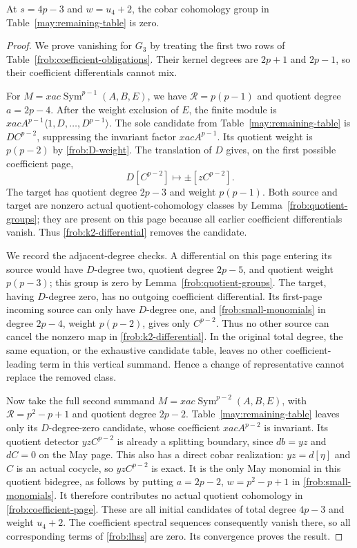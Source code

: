 \begin{proposition}[The row $k=2$]\label{frob:k2}
At $s=4p-3$ and $w=u_4+2$, the cobar cohomology group in
Table~\ref{may:remaining-table} is zero.
\end{proposition}

\begin{proof}
We prove vanishing for $G_3$ by treating the first two rows of
Table~\ref{frob:coefficient-obligations}.  Their kernel degrees are
$2p+1$ and $2p-1$, so their coefficient differentials cannot mix.

For $M=xac\operatorname{Sym}^{p-1}(A,B,E)$, we have
$\mathcal R=p(p-1)$ and quotient degree $a=2p-4$.
After the weight exclusion of $E$, the finite module is
$xacA^{p-1}\langle1,D,\ldots,D^{p-1}\rangle$.
The sole candidate from Table~\ref{may:remaining-table} is
$D C^{p-2}$, suppressing the invariant factor $xacA^{p-1}$.
Its quotient weight is $p(p-2)$ by \eqref{frob:D-weight}.
The translation of $D$ gives, on the first possible coefficient page,
\begin{equation}\label{frob:k2-differential}
 D[C^{p-2}]\longmapsto \pm[zC^{p-2}].
\end{equation}
The target has quotient degree $2p-3$ and weight $p(p-1)$.
Both source and target are nonzero actual quotient-cohomology classes
by Lemma~\ref{frob:quotient-groups}; they are present on this page because
all earlier coefficient differentials vanish.  Thus
\eqref{frob:k2-differential} removes the candidate.

We record the adjacent-degree checks.  A differential on this page
entering its source would have $D$-degree two, quotient degree
$2p-5$, and quotient weight $p(p-3)$; this group is zero
by Lemma~\ref{frob:quotient-groups}.  The target, having $D$-degree
zero, has no outgoing coefficient differential.  Its first-page
incoming source can only have $D$-degree one, and
\eqref{frob:small-monomials} in degree $2p-4$, weight $p(p-2)$,
gives only $C^{p-2}$.  Thus no other source can cancel the nonzero
map in \eqref{frob:k2-differential}.  In the original total degree,
the same equation, or the exhaustive candidate table, leaves no
other coefficient-leading term in this vertical summand.  Hence
a change of representative cannot replace the removed class.

Now take the full second summand
$M=xac\operatorname{Sym}^{p-2}(A,B,E)$, with $\mathcal R=p^2-p+1$
and quotient degree $2p-2$.
Table~\ref{may:remaining-table} leaves only its $D$-degree-zero candidate,
whose coefficient $xacA^{p-2}$ is invariant.
Its quotient detector $yzC^{p-2}$ is already a
splitting boundary, since $db=yz$ and $dC=0$ on the May page.
This also has a direct cobar realization: $yz=d[\eta]$ and $C$
is an actual cocycle, so $yzC^{p-2}$ is exact.  It is the only
May monomial in this quotient bidegree, as follows by putting
$a=2p-2$, $w=p^2-p+1$ in \eqref{frob:small-monomials}.
It therefore contributes no actual quotient cohomology in
\eqref{frob:coefficient-page}.  These are all initial candidates
of total degree $4p-3$ and weight $u_4+2$.  The coefficient spectral
sequences consequently vanish there, so all corresponding terms
of \eqref{frob:lhss} are zero.  Its convergence proves the result.
\end{proof}

